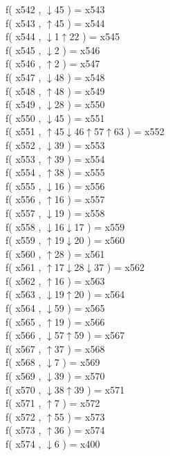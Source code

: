 f( x542 , $\downarrow$45 ) = x543 \\
f( x543 , $\uparrow$45 ) = x544 \\
f( x544 , $\downarrow$1$\uparrow$22 ) = x545 \\
f( x545 , $\downarrow$2 ) = x546 \\
f( x546 , $\uparrow$2 ) = x547 \\
f( x547 , $\downarrow$48 ) = x548 \\
f( x548 , $\uparrow$48 ) = x549 \\
f( x549 , $\downarrow$28 ) = x550 \\
f( x550 , $\downarrow$45 ) = x551 \\
f( x551 , $\uparrow$45$\downarrow$46$\uparrow$57$\uparrow$63 ) = x552 \\
f( x552 , $\downarrow$39 ) = x553 \\
f( x553 , $\uparrow$39 ) = x554 \\
f( x554 , $\uparrow$38 ) = x555 \\
f( x555 , $\downarrow$16 ) = x556 \\
f( x556 , $\uparrow$16 ) = x557 \\
f( x557 , $\downarrow$19 ) = x558 \\
f( x558 , $\downarrow$16$\downarrow$17 ) = x559 \\
f( x559 , $\uparrow$19$\downarrow$20 ) = x560 \\
f( x560 , $\uparrow$28 ) = x561 \\
f( x561 , $\uparrow$17$\downarrow$28$\downarrow$37 ) = x562 \\
f( x562 , $\uparrow$16 ) = x563 \\
f( x563 , $\downarrow$19$\uparrow$20 ) = x564 \\
f( x564 , $\downarrow$59 ) = x565 \\
f( x565 , $\uparrow$19 ) = x566 \\
f( x566 , $\downarrow$57$\uparrow$59 ) = x567 \\
f( x567 , $\uparrow$37 ) = x568 \\
f( x568 , $\downarrow$7 ) = x569 \\
f( x569 , $\downarrow$39 ) = x570 \\
f( x570 , $\downarrow$38$\uparrow$39 ) = x571 \\
f( x571 , $\uparrow$7 ) = x572 \\
f( x572 , $\uparrow$55 ) = x573 \\
f( x573 , $\uparrow$36 ) = x574 \\
f( x574 , $\downarrow$6 ) = x400 \\
